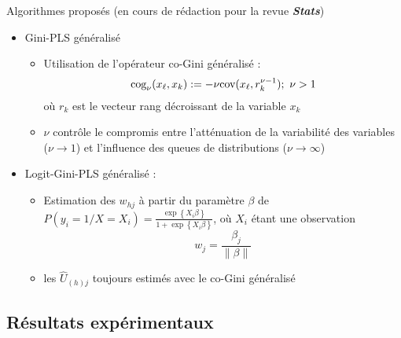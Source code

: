 \begin{frame}[t]{\mysubsectiontitle}
	Algorithmes proposés {\scriptsize (en cours de rédaction pour la revue \textit{\textbf{Stats}})}
\begin{itemize} \small
\setlength\itemsep{1.5em}

\item Gini-PLS généralisé
\begin{itemize} \scriptsize
	\item Utilisation de l'opérateur co-Gini généralisé : \[\text{cog}_\nu(x_\ell,x_k) := -\nu \text{cov}(x_\ell,r_{k}^{\nu-1}) ; \ \nu > 1\] où $r_{k}$ est le vecteur rang décroissant de la variable $x_k$
	
	\item $\nu$ contrôle le compromis entre l'atténuation de la variabilité des variables ($\nu \rightarrow 1$) et l'influence des queues de distributions ($\nu \rightarrow \infty$)	
\end{itemize}


\item Logit-Gini-PLS  généralisé : 
\begin{itemize} \scriptsize
	\item Estimation des $w_{hj}$ à partir du paramètre $\beta$ de $P(y_i = 1 / X = X_i) = \frac{\exp\left\{X_i \beta \right\}}{1+\exp\left\{ X_i \beta \right\}}$, où $X_i$ étant une observation
	\[w_j = \frac{\beta_j}{\| \beta\|}\]	
	\item les $\hat{U}_{(h)j}$ toujours estimés avec le co-Gini généralisé
\end{itemize} 
\end{itemize}
\end{frame}


\subsection{Résultats expérimentaux}

